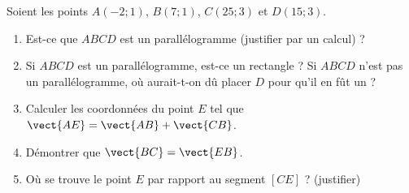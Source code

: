 
\begin{exercice}[\ldots/5]\label{exosmath-0669}

    Soient les points \( A(-2;1)\), \( B(7;1)\), \( C(25;3)\) et \( D(15;3)\).
    \begin{enumerate}
        \item
            Est-ce que \( ABCD\) est un parallélogramme (justifier par un calcul) ? 
        \item
            Si \( ABCD\) est un parallélogramme, est-ce un rectangle ? Si \( ABCD\) n'est pas un parallélogramme, où aurait-t-on dû placer \( D\) pour qu'il en fût un ?
        \item
            Calculer les coordonnées du point \( E\) tel que \( \vect{ AE }=\vect{ AB }+\vect{ CB }\).
        \item
            Démontrer que \( \vect{ BC }=\vect{ EB }\).
        \item
            Où se trouve le point \( E\) par rapport au segment \( [CE]\) ? (justifier)
    \end{enumerate}

\end{exercice}
